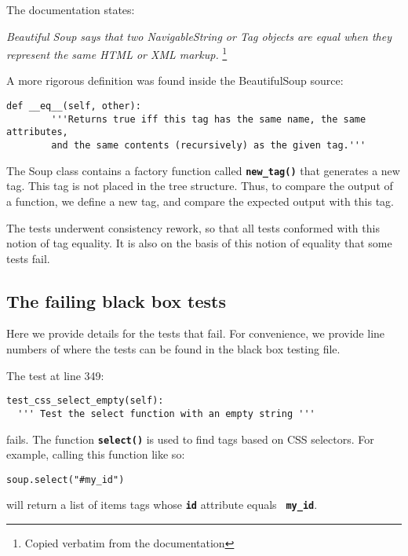 \documentclass[10pt]{article}
\newcommand{\tbt}[1]{\texttt{\textbf{#1}}}
\begin{document}
The documentation states: 
\begin{center}
  \textit{Beautiful Soup says that two NavigableString or Tag objects are equal when they represent the same HTML or XML markup.} \footnote{Copied verbatim from the documentation}
\end{center}

A more rigorous definition was found inside the BeautifulSoup source:
\begin{lstlisting}[style = pythonstyle]
  def __eq__(self, other):
        '''Returns true iff this tag has the same name, the same attributes,
        and the same contents (recursively) as the given tag.'''
\end{lstlisting}

The Soup class contains a factory function called \tbt{new\_tag()} that generates a new tag. This tag is not placed in the tree structure. Thus, to compare the output of a function, we define a new tag, and compare the expected output with this tag.

The tests underwent consistency rework, so that all tests conformed with this notion of tag equality. It is also on the basis of this notion of equality that some tests fail. 

\subsection{The failing black box tests}

Here we provide details for the tests that fail. For convenience, we provide line numbers of where the tests can be found in the black box testing file. \\

\noindent\begin{minipage}{\textwidth}
\indent{\hspace{12pt}} The test at line 349:
\begin{lstlisting}[style = pythonstyle]
test_css_select_empty(self):
  ''' Test the select function with an empty string '''
\end{lstlisting}
\end{minipage}
fails. The function \tbt{select()} is used to find tags based on CSS selectors. For example, calling this function like so:
\begin{lstlisting}[style = pythonstyle]
soup.select("#my_id")
\end{lstlisting}
will return a list of items tags whose \tbt{id} attribute equals \tbt{\color{dark-green} my\_id}.  \\
\end{document}
